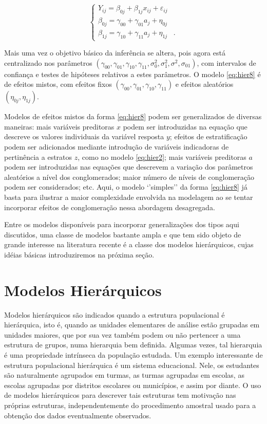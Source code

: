 \documentclass[]{book}
\numberwithin{example}{chapter}
\numberwithin{remark}{chapter}
\numberwithin{definition}{chapter}
\begin{document}
\begin{equation}
\left\{ 
\begin{array}{l}
Y_{ij}=\beta _{0j}+\beta _{1j}x_{ij}+\varepsilon _{ij} \\ 
\beta _{0j}=\gamma _{00}+\gamma _{01}a_{j}+\eta _{0j} \\ 
\beta _{1j}=\gamma _{10}+\gamma _{11}a_{j}+\eta _{1j}\;\;\;.
\end{array}
\right.  \label{eq:hier8}
\end{equation}

Mais uma vez o objetivo básico da inferência se altera, pois agora está
centralizado nos parâmetros
\(\left( \gamma _{00},\gamma_{01},\gamma _{10},\gamma _{11},\sigma _{0}^{2},\sigma _{1}^{2},\sigma^{2},\sigma _{01}\right)\),
com intervalos de confiança e testes de hipóteses relativos a estes
parâmetros. O modelo \eqref{eq:hier8} é de efeitos mistos, com efeitos
fixos
\(\left( \gamma _{00},\gamma_{01},\gamma _{10},\gamma _{11}\right)\) e
efeitos aleatórios \(\left(\eta _{0j},\eta _{1j}\right)\).

Modelos de efeitos mistos da forma \eqref{eq:hier8} podem ser
generalizados de diversas maneiras: mais variáveis preditoras \(x\)
podem ser introduzidas na equação que descreve os valores individuais da
variável resposta \(y\); efeitos de estratificação podem ser adicionados
mediante introdução de variáveis indicadoras de pertinência a estratos
\(z\), como no modelo \eqref{eq:hier2}; mais variáveis preditoras \(a\)
podem ser introduzidas nas equações que descrevem a variação dos
parâmetros aleatórios a nível dos conglomerados; maior número de níveis
de conglomeração podem ser considerados; etc. Aqui, o modelo `'simples''
da forma \eqref{eq:hier8} já basta para ilustrar a maior complexidade
envolvida na modelagem ao se tentar incorporar efeitos de conglomeração
nessa abordagem desagregada.

Entre os modelos disponíveis para incorporar generalizações dos tipos
aqui discutidos, uma classe de modelos bastante ampla e que tem sido
objeto de grande interesse na literatura recente é a classe dos modelos
hierárquicos, cujas idéias básicas introduziremos na próxima seção.

\section{Modelos Hierárquicos}\label{modelos-hierarquicos-1}

Modelos hierárquicos são indicados quando a estrutura populacional é
hierárquica, isto é, quando as unidades elementares de análise estão
grupadas em unidades maiores, que por sua vez também podem ou não
pertencer a uma estrutura de grupos, numa hierarquia bem definida.
Algumas vezes, tal hierarquia é uma propriedade intrínseca da população
estudada. Um exemplo interessante de estrutura populacional hierárquica
é um sistema educacional. Nele, os estudantes são naturalmente agrupados
em turmas, as turmas agrupadas em escolas, as escolas agrupadas por
distritos escolares ou municípios, e assim por diante. O uso de modelos
hierárquicos para descrever tais estruturas tem motivação nas próprias
estruturas, independentemente do procedimento amostral usado para a
obtenção dos dados eventualmente observados.
\end{document}
